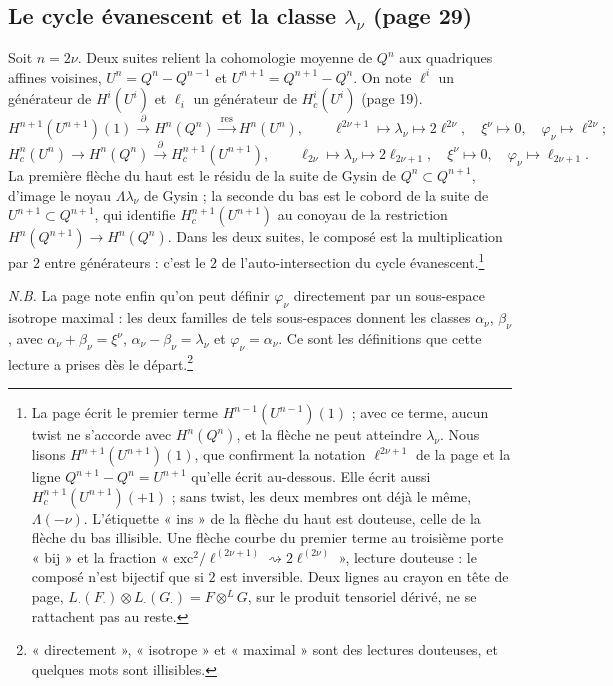\documentclass[11pt,a4paper]{article}
\begin{document}
\subsection*{Le cycle évanescent et la classe $\lambda_{\nu}$ (page 29)}

Soit $n = 2\nu$. Deux suites relient la cohomologie moyenne de $Q^{n}$ aux
quadriques affines voisines, $U^{n} = Q^{n} - Q^{n-1}$ et
$U^{n+1} = Q^{n+1} - Q^{n}$. On note $\ell^{i}$ un générateur de
$H^{i}(U^{i})$ et $\ell_{i}$ un générateur de $H^{i}_{c}(U^{i})$ (page 19).
\[
  H^{n+1}(U^{n+1})(1) \xrightarrow{\ \partial\ } H^{n}(Q^{n})
    \xrightarrow{\ \text{res}\ } H^{n}(U^{n}),
  \qquad
  \ell^{2\nu+1} \mapsto \lambda_{\nu} \mapsto 2\ell^{2\nu}, \quad
  \xi^{\nu} \mapsto 0, \quad \varphi_{\nu} \mapsto \ell^{2\nu} ;
\]
\[
  H^{n}_{c}(U^{n}) \longrightarrow H^{n}(Q^{n}) \xrightarrow{\ \partial\ }
    H^{n+1}_{c}(U^{n+1}),
  \qquad
  \ell_{2\nu} \mapsto \lambda_{\nu} \mapsto 2\ell_{2\nu+1}, \quad
  \xi^{\nu} \mapsto 0, \quad \varphi_{\nu} \mapsto \ell_{2\nu+1} .
\]
La première flèche du haut est le résidu de la suite de Gysin de
$Q^{n} \subset Q^{n+1}$, d'image le noyau $\Lambda\lambda_{\nu}$ de Gysin ;
la seconde du bas est le cobord de la suite de $U^{n+1} \subset Q^{n+1}$,
qui identifie $H^{n+1}_{c}(U^{n+1})$ au conoyau de la restriction
$H^{n}(Q^{n+1}) \to H^{n}(Q^{n})$. Dans les deux suites, le composé est la
multiplication par $2$ entre générateurs : c'est le $2$ de
l'auto-intersection du cycle évanescent.\footnote{La page écrit le premier
terme $H^{n-1}(U^{n-1})(1)$ ; avec ce terme, aucun twist ne s'accorde avec
$H^{n}(Q^{n})$, et la flèche ne peut atteindre $\lambda_{\nu}$. Nous lisons
$H^{n+1}(U^{n+1})(1)$, que confirment la notation $\ell^{2\nu+1}$ de la page
et la ligne $Q^{n+1} - Q^{n} = U^{n+1}$ qu'elle écrit au-dessous. Elle
écrit aussi $H^{n+1}_{c}(U^{n+1})(+1)$ ; sans twist, les deux membres ont
déjà le même, $\Lambda(-\nu)$. L'étiquette « ins » de la flèche du
haut est douteuse, celle de la flèche du bas illisible. Une flèche courbe
du premier terme au troisième porte « bij » et la fraction
« $\mathrm{exc}^{2}/\ell^{(2\nu+1)} \rightsquigarrow 2\ell^{(2\nu)}$ »,
lecture douteuse : le composé n'est bijectif que si $2$ est inversible.
Deux lignes au crayon en tête de page,
$L_{\cdot}(F_{\cdot}) \otimes L_{\cdot}(G_{\cdot}) = F \otimes^{L} G$, sur le
produit tensoriel dérivé, ne se rattachent pas au reste.}

\emph{N.B.} La page note enfin qu'on peut définir $\varphi_{\nu}$
directement par un sous-espace isotrope maximal : les deux familles de
tels sous-espaces donnent les classes $\alpha_{\nu}$, $\beta_{\nu}$, avec
$\alpha_{\nu} + \beta_{\nu} = \xi^{\nu}$,
$\alpha_{\nu} - \beta_{\nu} = \lambda_{\nu}$ et
$\varphi_{\nu} = \alpha_{\nu}$. Ce sont les définitions que cette lecture
a prises dès le départ.\footnote{« directement », « isotrope » et
« maximal » sont des lectures douteuses, et quelques mots sont
illisibles.}
\end{document}
